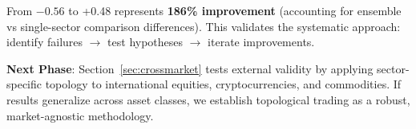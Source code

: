 From $-0.56$ to +0.48 represents \textbf{186\% improvement} (accounting for ensemble vs single-sector comparison differences). This validates the systematic approach: identify failures $\rightarrow$ test hypotheses $\rightarrow$ iterate improvements.

\textbf{Next Phase}: Section~\ref{sec:crossmarket} tests external validity by applying sector-specific topology to international equities, cryptocurrencies, and commodities. If results generalize across asset classes, we establish topological trading as a robust, market-agnostic methodology.
